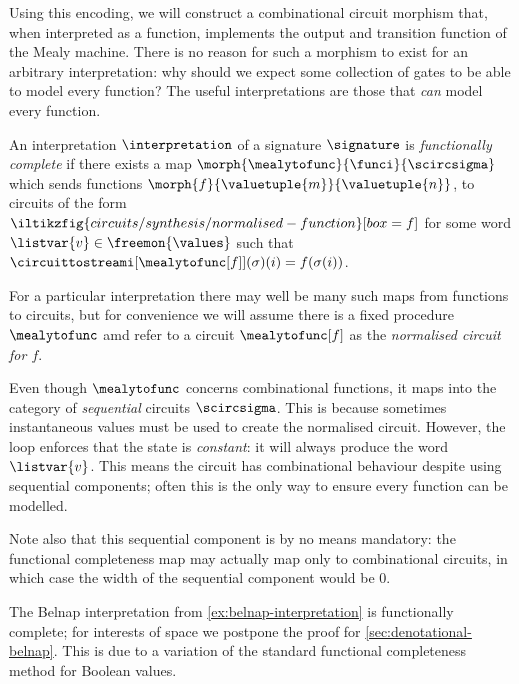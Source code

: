 Using this encoding, we will construct a combinational circuit morphism that,
when interpreted as a function, implements the output and transition function
of the Mealy machine.
There is no reason for such a morphism to exist for an arbitrary interpretation:
why should we expect some collection of gates to be able to model every
function?
The useful interpretations are those that \emph{can} model every function.

\begin{definition}\label{def:functional-completeness}
    An interpretation \(\interpretation\) of a signature \(\signature\) is
    \emph{functionally complete} if there exists a map \(
    \morph{\mealytofunc}{\funci}{\scircsigma}
    \) which sends functions \(
    \morph{f}{\valuetuple{m}}{\valuetuple{n}}
    \), to circuits of the form \(
    \iltikzfig{circuits/synthesis/normalised-function}[box=f]
    \) for some word \(\listvar{v} \in \freemon{\values}\) such that
    \(\circuittostreami[\mealytofunc[f]](\sigma)(i) = f(\sigma(i))\).
\end{definition}

For a particular interpretation there may well be many such maps from functions
to circuits, but for convenience we will assume there is a fixed procedure
\(\mealytofunc\) amd refer to a circuit \(\mealytofunc[f]\) as the
\emph{normalised circuit for \(f\)}.\

\begin{remark}
    Even though \(\mealytofunc\) concerns combinational functions, it maps into
    the category of \emph{sequential} circuits \(\scircsigma\).
    This is because sometimes instantaneous values must be used to create the
    normalised circuit.
    However, the loop enforces that the state is \emph{constant}: it will always
    produce the word \(\listvar{v}\).
    This means the circuit has combinational behaviour despite using sequential
    components; often this is the only way to ensure every function can be
    modelled.

    Note also that this sequential component is by no means mandatory: the
    functional completeness map may actually map only to combinational circuits,
    in which case the width of the sequential component would be \(0\).
\end{remark}

\begin{example}
    The Belnap interpretation from \cref{ex:belnap-interpretation} is
    functionally complete; for interests of space we postpone the proof for
    \cref{sec:denotational-belnap}.
    This is due to a variation of the standard functional
    completeness method for Boolean values.
\end{example}

